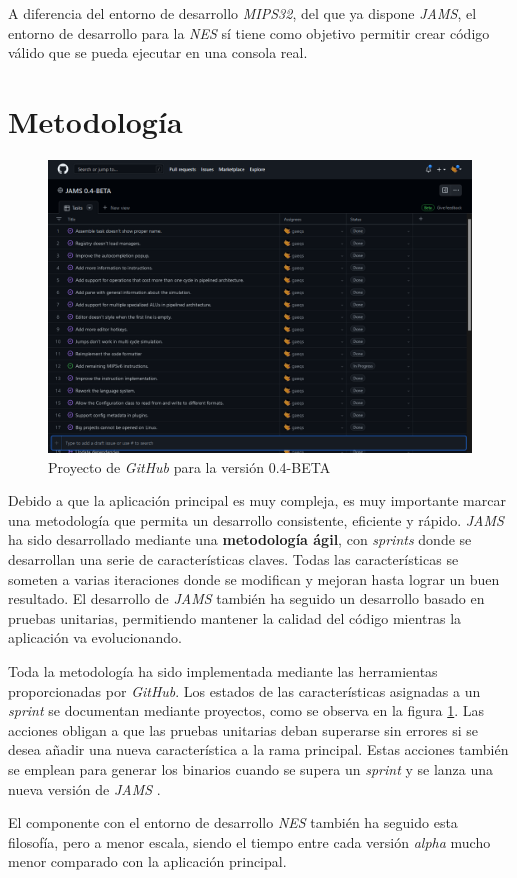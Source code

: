 A diferencia del entorno de desarrollo \textit{MIPS32}, del
  que ya dispone \emph{JAMS}, el entorno
de desarrollo para la \textit{NES} sí tiene como objetivo permitir crear
código válido que se pueda ejecutar en una consola real.


\section{Metodología}\label{sec:metodologia}

\begin{figure}[h]
    \centering
    \includegraphics[width=\textwidth]{images/introduction/github}
    \caption{Proyecto de \textit{GitHub} para la versión 0.4-BETA}
    \label{fig:introduccion-github}
\end{figure}

Debido a que la aplicación principal es muy compleja,
es muy importante marcar una metodología que permita un
desarrollo consistente, eficiente y rápido.
\textit{JAMS} ha sido desarrollado mediante una \textbf{metodología ágil},
con \textit{sprints} donde se desarrollan una serie de características claves.
Todas las características se someten a varias iteraciones donde se modifican y mejoran hasta lograr un
buen resultado.
El desarrollo de \textit{JAMS} también ha seguido un desarrollo
basado en pruebas unitarias, permitiendo mantener la calidad del
código mientras la aplicación va evolucionando.

Toda la metodología ha sido implementada mediante
las herramientas proporcionadas por \textit{GitHub}.
Los estados de las características asignadas a un \textit{sprint}
se documentan mediante proyectos, como se observa en la figura \ref{fig:introduccion-github}.
Las acciones obligan a que las pruebas unitarias deban superarse
sin errores si se desea añadir una nueva característica a la rama principal.
Estas acciones también se emplean para generar los binarios
cuando se supera un \textit{sprint} y se lanza una
nueva versión de \textit{JAMS} .

El componente con el entorno de desarrollo \textit{NES}
también ha seguido esta filosofía, pero a menor escala, siendo el
tiempo entre cada versión \textit{alpha} mucho menor comparado
con la aplicación principal.
